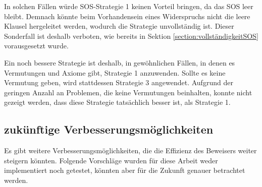 	In solchen Fällen würde SOS-Strategie 1 keinen Vorteil bringen, da das SOS leer bleibt. Demnach könnte beim Vorhandensein eines Widerspruchs nicht die leere Klausel hergeleitet werden, wodurch die Strategie unvollständig ist. Dieser Sonderfall ist deshalb verboten, wie bereits in Sektion \ref{section:vollständigkeitSOS} vorausgesetzt wurde.
	
	Ein noch bessere Strategie ist deshalb, in gewöhnlichen Fällen, in denen es Vermutungen und Axiome gibt, Strategie 1 anzuwenden. Sollte es keine Vermutung geben, wird stattdessen Strategie 3 angewendet. Aufgrund der geringen Anzahl an Problemen, die keine Vermutungen beinhalten, konnte nicht gezeigt werden, dass diese Strategie tatsächlich besser ist, als Strategie 1.
	
	\subsection{zukünftige Verbesserungsmöglichkeiten}
	Es gibt weitere Verbesserungsmöglichkeiten, die die Effizienz des Beweisers weiter steigern könnten. Folgende Vorschläge wurden für diese Arbeit weder implementiert noch getestet, könnten aber für die Zukunft genauer betrachtet werden.
